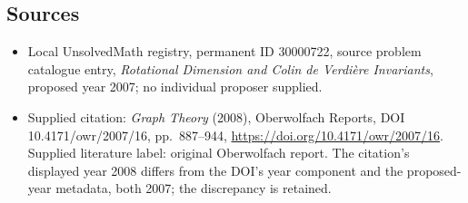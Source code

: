 \documentclass[11pt]{article}
\begin{document}
\subsection{Sources}
\begin{itemize}\item Local UnsolvedMath registry, permanent ID 30000722, source problem catalogue entry, \emph{Rotational Dimension and Colin de Verdi\`ere Invariants}, proposed year 2007; no individual proposer supplied.\item Supplied citation: \emph{Graph Theory} (2008), Oberwolfach Reports, DOI 10.4171/owr/2007/16, pp.\ 887--944, \url{https://doi.org/10.4171/owr/2007/16}. Supplied literature label: original Oberwolfach report. The citation's displayed year 2008 differs from the DOI's year component and the proposed-year metadata, both 2007; the discrepancy is retained.\end{itemize}
\end{document}
